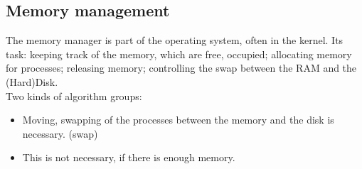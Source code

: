 \documentclass[margin=0px]{article}
\begin{document}
\subsection{Memory management}

The memory manager is part of the operating system, often in the kernel. Its task: keeping track of the memory, which are free, occupied; allocating memory for processes; releasing memory; controlling the swap between the RAM and the (Hard)Disk. \\
Two kinds of algorithm groups:
\begin{itemize}
    \item Moving, swapping of the processes between the memory and the disk is necessary. (swap)
    \item This is not necessary, if there is enough memory.
\end{itemize}
\end{document}
